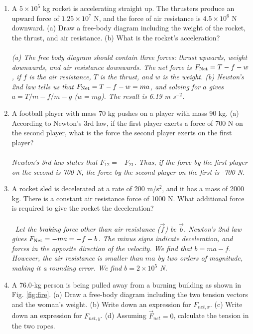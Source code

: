 \documentclass[10pt]{article}
\begin{document}
\begin{enumerate}
\item A $5\times 10^5$ kg rocket is accelerating straight up.  The thrusters produce an upward force of $1.25 \times 10^7$ N, and the force of air resistance is $4.5 \times 10^6$ N downward.  (a) Draw a free-body diagram including the weight of the rocket, the thrust, and air resistance.  (b) What is the rocket’s acceleration? \\ \\
\textit{(a) The free body diagram should contain three forces: thrust upwards, weight downwards, and air resistance downwards.  The net force is $F_{\rm Net} = T - f - w$, if $f$ is the air resistance, $T$ is the thrust, and $w$ is the weight. (b) Newton's 2nd law tells us that $F_{\rm Net} = T - f - w = ma$, and solving for $a$ gives $a = T/m - f/m - g$ ($w = mg$).  The result is 6.19 m s$^{-2}$.}
\item A football player with mass 70 kg pushes on a player with mass 90 kg.  (a) According to Newton's 3rd law, if the first player exerts a force of 700 N on the second player, what is the force the second player exerts on the first player? \\ \\ \textit{Newton's 3rd law states that $F_{12} = - F_{21}$.  Thus, if the force by the first player on the second is 700 N, the force by the second player on the first is -700 N.}
\item A rocket sled is decelerated at a rate of 200 m/s$^2$, and it has a mass of 2000 kg.  There is a constant air resistance force of 1000 N.  What additional force is required to give the rocket the deceleration?  \\ \\\
\textit{Let the braking force other than air resistance ($\vec{f}$) be $\vec{b}$.  Newton's 2nd law gives $F_{\rm Net} = -ma = -f - b$.  The minus signs indicate deceleration, and forces in the opposite direction of the velocity.  We find that $b = ma - f$.  However, the air resistance is smaller than $ma$ by two orders of magnitude, making it a rounding error.  We find $b = 2\times 10^{5}$ N.}
\item A 76.0-kg person is being pulled away from a burning building as shown in Fig. \ref{fig:fire}.  (a) Draw a free-body diagram including the two tension vectors and the woman's weight.  (b) Write down an expression for $F_{net,x}$.  (c) Write down an expression for $F_{net,y}$.  (d) Assuming $\vec{F}_{net} = 0$, calculate the tension in the two ropes. \\ \\

\end{enumerate}
\end{document}

